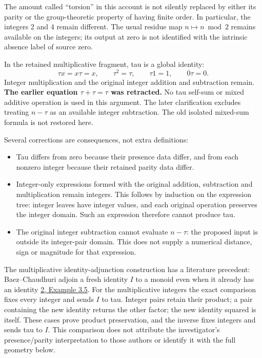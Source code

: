 \documentclass[
]{article}
\providecommand{\tightlist}{%
  \setlength{\itemsep}{0pt}\setlength{\parskip}{0pt}}
\begin{document}
The amount called ``torsion'' in this account is not silently replaced
by either its parity or the group-theoretic property of having finite
order. In particular, the integers 2 and 4 remain different. The usual
residue map \(n\mapsto n\bmod2\) remains available on the integers; its
output at zero is not identified with the intrinsic absence label of
source zero.

In the retained multiplicative fragment, tau is a global identity: \[
\tau x=x\tau=x,\qquad \tau^2=\tau,
\qquad \tau1=1,\qquad0\tau=0.
\] Integer multiplication and the original integer addition and
subtraction remain. \textbf{The earlier equation \(\tau+\tau=\tau\) was
retracted.} No tau self-sum or mixed additive operation is used in this
argument. The later clarification excludes treating \(n-\tau\) as an
available integer subtraction. The old isolated mixed-sum formula is not
restored here.

Several corrections are consequences, not extra definitions:

\begin{itemize}
\tightlist
\item
  Tau differs from zero because their presence data differ, and from
  each nonzero integer because their retained parity data differ.
\item
  Integer-only expressions formed with the original addition,
  subtraction and multiplication remain integers. This follows by
  induction on the expression tree: integer leaves have integer values,
  and each original operation preserves the integer domain. Such an
  expression therefore cannot produce tau.
\item
  The original integer subtraction cannot evaluate \(n-\tau\): the
  proposed input is outside its integer-pair domain. This does not
  supply a numerical distance, sign or magnitude for that expression.
\end{itemize}

The multiplicative identity-adjunction construction has a literature
precedent: Baez--Chaudhuri adjoin a fresh identity \(I\) to a monoid
even when it already has an identity
\href{https://arxiv.org/html/2506.23375v3}{2, Example 3.5}. For the
multiplicative integers the exact comparison fixes every integer and
sends \(I\) to tau. Integer pairs retain their product; a pair
containing the new identity returns the other factor; the new identity
squared is itself. These cases prove product preservation, and the
inverse fixes integers and sends tau to \(I\). This comparison does not
attribute the investigator's presence/parity interpretation to those
authors or identify it with the full geometry below.
\end{document}
